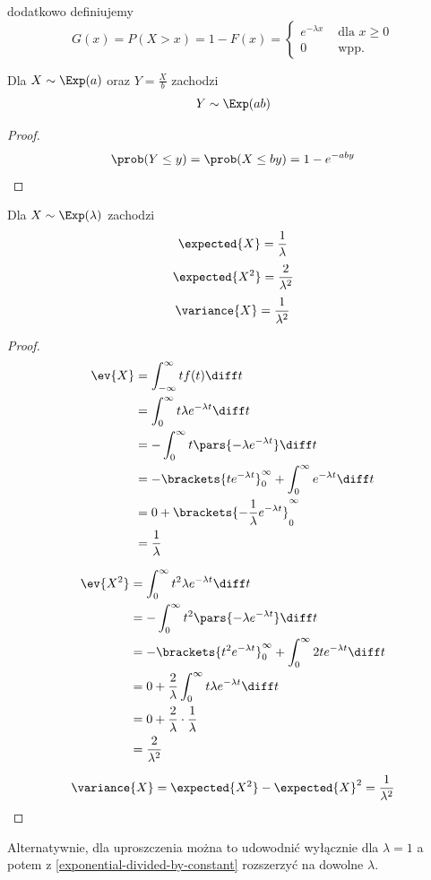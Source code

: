 dodatkowo definiujemy
\[
	G(x) = P(X > x) = 1 - F(x) = \begin{cases}
		e^{-\lambda x} & \text{ dla } x \geq 0 \\
		0              & \text{ wpp. }
	\end{cases}
\]

\begin{lemma}
	\label{exponential-divided-by-constant}
	Dla \(X \sim \Exp(a)\) oraz \(Y = \frac{X}{b}\) zachodzi
	\[
		Y \sim \Exp(ab)
	\]
\end{lemma}
\begin{proof}
	\[
		\prob(Y \leq y) = \prob(X \leq by) = 1 - e^{-aby}
	\]
\end{proof}

\begin{theorem}
	Dla \(X \sim \Exp(\lambda)\) zachodzi
	\[
		\expected{X} = \frac{1}{\lambda}
	\]
	\[
		\expected{X^2} = \frac{2}{\lambda^2}
	\]
	\[
		\variance{X} =\frac{1}{\lambda^2}
	\]
\end{theorem}
\begin{proof}
	\begin{align*}
		\ev{X} & = \int_{-\infty}^\infty t f(t) \diff t                                         \\
		       & = \int_0^\infty t \lambda e^{-\lambda t} \diff t                               \\
		       & = -\int_0^\infty t \pars{-\lambda e^{-\lambda t}} \diff t                      \\
		       & = -\brackets{t e^{-\lambda t}}_0^\infty + \int_0^\infty e^{-\lambda t} \diff t \\
		       & = 0 + \brackets{-\frac{1}{\lambda} e^{-\lambda t}}_0^\infty                    \\
		       & = \frac{1}{\lambda}
	\end{align*}

	\begin{align*}
		\ev{X^2} & = \int_0^\infty t^2 \lambda e^{-\lambda t} \diff t                                  \\
		         & = -\int_0^\infty t^2 \pars{-\lambda e^{-\lambda t}} \diff t                         \\
		         & = -\brackets{t^2 e^{-\lambda t}}_0^\infty + \int_0^\infty 2t e^{-\lambda t} \diff t \\
		         & = 0 + \frac{2}{\lambda} \int_0^\infty t \lambda e^{-\lambda t} \diff t              \\
		         & = 0 + \frac{2}{\lambda} \cdot \frac{1}{\lambda}                                     \\
		         & = \frac{2}{\lambda^2}
	\end{align*}

	\[
		\variance{X} = \expected{X^2} - \expected{X}^2 = \frac{1}{\lambda^2}
	\]
\end{proof}
Alternatywnie, dla uproszczenia można to udowodnić wyłącznie dla \(\lambda = 1\) a potem z \ref{exponential-divided-by-constant} rozszerzyć na dowolne \(\lambda\).

